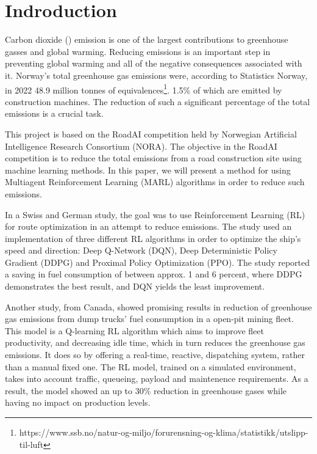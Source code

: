 \documentclass[conference]{IEEEtran}
\begin{document}
\section{Indroduction}
Carbon dioxide (\coo{}) emission is one of the largest contributions to greenhouse gasses and global warming.
Reducing \coo{} emissions is an important step in preventing global warming and all of the negative
consequences associated with it. Norway's total greenhouse gas emissions were, according to Statistics
Norway, in 2022 48.9 million tonnes of \coo{}
equivalences\footnote{https://www.ssb.no/natur-og-miljo/forurensning-og-klima/statistikk/utslipp-til-luft}.
1.5\% of which are emitted by construction machines. \cite{noraRoadAIReducing} The reduction of such
a significant percentage of the total emissions is a crucial task.

This project is based on the RoadAI competition held by Norwegian Artificial Intelligence Research
Consortium (NORA). \cite{noraRoadAIReducing} The objective in the RoadAI competition is to reduce the
total \coo{} emissions from a road construction site using machine learning methods. In this paper, we will
present a method for using Multiagent Reinforcement Learning (MARL) algorithms in order to reduce such
emissions.

In a Swiss and German study, the goal was to use Reinforcement Learning (RL) for route optimization in
an attempt to reduce \coo emissions. \cite{MORADI2022111882} The study used an implementation of three
different RL algorithms in order to optimize the ship's speed and direction: Deep Q-Network (DQN),
Deep Deterministic Policy Gradient (DDPG) and Proximal Policy Optimization (PPO). The study reported a
saving in fuel consumption of between approx. 1 and 6 percent, where DDPG demonstrates the best result,
and DQN yields the least improvement.

Another study, from Canada, \cite{HUO2023106664} showed promising results in reduction of greenhouse gas
emissions
from dump trucks' fuel consumption in a open-pit mining fleet. This model is a Q-learning RL algorithm
which aims to improve fleet productivity, and decreasing idle time, which in turn reduces the greenhouse
gas emissions. It does so by offering a real-time, reactive,  dispatching system, rather than a manual
fixed one. The RL model, trained on a simulated environment, takes into account traffic, queueing,
payload and maintenence requirements. As a result, the model showed an up to 30\% reduction in greenhouse
gases while having no impact on production levels.
\end{document}
